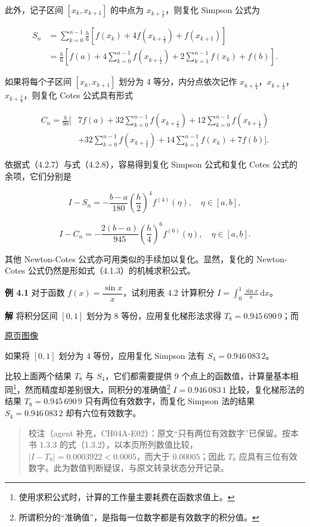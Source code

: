 \documentclass[
  10pt,
  fontset=fandol]{ctexart}
\begin{document}
此外，记子区间 \([x_k,x_{k+1}]\) 的中点为 \(x_{k+\frac12}\)，则复化 Simpson 公式为

\[
\begin{aligned}
S_n&=\sum_{k=0}^{n-1}\frac h6[f(x_k)+4f(x_{k+\frac12})+f(x_{k+1})]\\
&=\frac h6\left[f(a)+4\sum_{k=0}^{n-1}f(x_{k+\frac12})+2\sum_{k=1}^{n-1}f(x_k)+f(b)\right].
\end{aligned}
\tag{4.2.11}
\]

如果将每个子区间 \([x_k,x_{k+1}]\) 划分为 4 等分，内分点依次记作 \(x_{k+\frac14}\)，\(x_{k+\frac12}\)，\(x_{k+\frac34}\)，则复化 Cotes 公式具有形式

\[
\begin{aligned}
C_n=\frac h{90}\biggl[&7f(a)+32\sum_{k=0}^{n-1}f(x_{k+\frac14})+12\sum_{k=0}^{n-1}f(x_{k+\frac12})\\
&+32\sum_{k=0}^{n-1}f(x_{k+\frac34})+14\sum_{k=1}^{n-1}f(x_k)+7f(b)\biggr].
\end{aligned}
\tag{4.2.12}
\]

依据式（4.2.7）与式（4.2.8），容易得到复化 Simpson 公式和复化 Cotes 公式的余项，它们分别是

\[
I-S_n=-\frac{b-a}{180}\left(\frac h2\right)^4f^{(4)}(\eta),\quad\eta\in[a,b],
\tag{4.2.13}
\]

\[
I-C_n=-\frac{2(b-a)}{945}\left(\frac h4\right)^6f^{(6)}(\eta),\quad\eta\in[a,b].
\tag{4.2.14}
\]

其他 Newton-Cotes 公式亦可用类似的手续加以复化。显然，复化的 Newton-Cotes 公式仍然是形如式（4.1.3）的机械求积公式。

\textbf{例 4.1} 对于函数 \(f(x)=\dfrac{\sin x}{x}\)，试利用表 4.2 计算积分 \(I=\displaystyle\int_0^1\frac{\sin x}{x}\,\mathrm{d}x\)。

\textbf{解} 将积分区间 \([0,1]\) 划分为 8 等份，应用复化梯形法求得 \(T_8=0.945\,690\,9\)；而

\href{../../source-images/pdf-100.jpeg}{原页图像}

如果将 \([0,1]\) 划分为 4 等份，应用复化 Simpson 法有 \(S_4=0.946\,083\,2\)。

比较上面两个结果 \(T_8\) 与 \(S_4\)，它们都需要提供 9 个点上的函数值，计算量基本相同\footnote{使用求积公式时，计算的工作量主要耗费在函数求值上。}，然而精度却差别很大，同积分的准确值\footnote{所谓积分的``准确值''，是指每一位数字都是有效数字的积分值。} \(I=0.946\,083\,1\) 比较，复化梯形法的结果 \(T_8=0.945\,690\,9\) 只有两位有效数字，而复化 Simpson 法的结果 \(S_4=0.946\,083\,2\) 却有六位有效数字。

\begin{quote}
校注（agent 补充，CH04A-E02）：原文``只有两位有效数字''已保留。按本书 1.3.3 的式（1.3.2），以本页所列数值比较，\(|I-T_8|=0.0003922<0.0005\)，而大于 \(0.00005\)；因此 \(T_8\) 应具有三位有效数字。此为数值判断疑误，与原文转录状态分开记录。
\end{quote}
\end{document}
